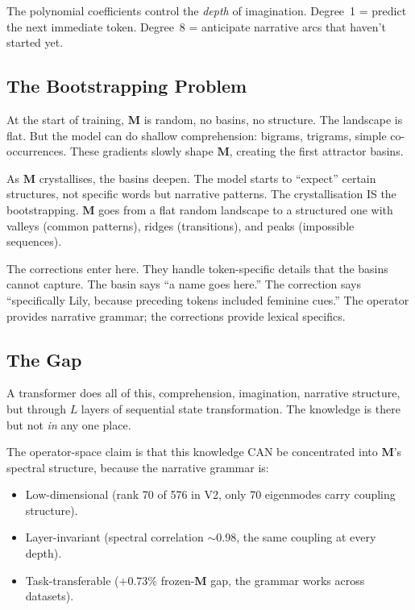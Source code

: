 \documentclass[11pt, a4paper]{article}
\newcommand{\M}{\mathbf{M}}
\theoremstyle{plain}
\theoremstyle{definition}
\theoremstyle{remark}
\begin{document}
The polynomial coefficients control the \emph{depth} of imagination.
Degree~1 = predict the next immediate token.
Degree~8 = anticipate narrative arcs that haven't started yet.

\subsection{The Bootstrapping Problem}

At the start of training, $\M$ is random, no basins, no structure.
The landscape is flat.
But the model can do shallow comprehension: bigrams, trigrams, simple co-occurrences.
These gradients slowly shape $\M$, creating the first attractor basins.

As $\M$ crystallises, the basins deepen.
The model starts to ``expect'' certain structures, not specific words but narrative patterns.
The crystallisation IS the bootstrapping.
$\M$ goes from a flat random landscape to a structured one with valleys (common patterns), ridges (transitions), and peaks (impossible sequences).

The corrections enter here.
They handle token-specific details that the basins cannot capture.
The basin says ``a name goes here.''
The correction says ``specifically Lily, because preceding tokens included feminine cues.''
The operator provides narrative grammar; the corrections provide lexical specifics.

\subsection{The Gap}

A transformer does all of this, comprehension, imagination, narrative structure, but through $L$ layers of sequential state transformation.
The knowledge is there but not \emph{in} any one place.

The operator-space claim is that this knowledge CAN be concentrated into $\M$'s spectral structure, because the narrative grammar is:
\begin{itemize}[nosep]
\item Low-dimensional (rank 70 of 576 in V2, only 70 eigenmodes carry coupling structure).
\item Layer-invariant (spectral correlation $\sim$0.98, the same coupling at every depth).
\item Task-transferable ($+0.73\%$ frozen-$\M$ gap, the grammar works across datasets).
\end{itemize}
\end{document}
